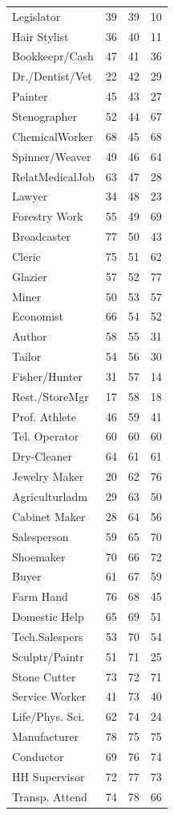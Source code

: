 \begin{tabular}{lccc}
Legislator&39&39&10\\
Hair Stylist&36&40&11\\
Bookkeepr/Cash&47&41&36\\
Dr./Dentist/Vet&22&42&29\\
Painter&45&43&27\\
Stenographer&52&44&67\\
ChemicalWorker&68&45&68\\
Spinner/Weaver&49&46&64\\
RelatMedicalJob&63&47&28\\
Lawyer&34&48&23\\
Forestry Work&55&49&69\\
Broadcaster&77&50&43\\
Cleric&75&51&62\\
Glazier&57&52&77\\
Miner&50&53&57\\
Economist&66&54&52\\
Author&58&55&31\\
Tailor&54&56&30\\
Fisher/Hunter&31&57&14\\
Rest./StoreMgr&17&58&18\\
Prof. Athlete&46&59&41\\
Tel. Operator&60&60&60\\
Dry-Cleaner&64&61&61\\
Jewelry Maker&20&62&76\\
Agriculturladm&29&63&50\\
Cabinet Maker&28&64&56\\
Salesperson&59&65&70\\
Shoemaker&70&66&72\\
Buyer&61&67&59\\
Farm Hand&76&68&45\\
Domestic Help&65&69&51\\
Tech.Salespers&53&70&54\\
Sculptr/Paintr&51&71&25\\
Stone Cutter&73&72&71\\
Service Worker&41&73&40\\
Life/Phys. Sci.&62&74&24\\
Manufacturer&78&75&75\\
Conductor&69&76&74\\
HH Supervisor&72&77&73\\
Transp. Attend&74&78&66\\
\hline\hline
\end{tabular}
